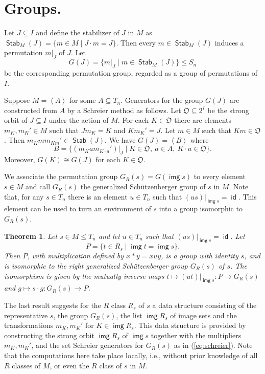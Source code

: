 \documentclass[12pt]{amsart}
\newtheorem{Thm}{Theorem}
\newcommand{\id}{\mathop{\mathsf{id}}\nolimits}
\newcommand{\img}{\mathop{\mathsf{img}}}
\newcommand{\Stab}{\mathop{\mathsf{Stab}}\nolimits}
\renewcommand{\O}{\mathfrak{O}}
\newcommand{\rest}{\big|}  %
\begin{document}
\section{Groups.}
Let $J \subseteq I$ and define the stabilizer of $J$ in  $M$ as $\Stab_M(J) =
\{m \in M  \mid J \cdot  m = J\}$.  Then  every $m \in \Stab_M(J)$  induces a
permutation  $m\rest_J$ of $J$.  Let 
\[
  G(J)  = \{m \rest_J \mid m  \in \Stab_M(J) \} \leq S_n
\]
be  the corresponding permutation group,  regarded as a group of permutations
of $I$.

Suppose $M = \left<A\right>$ for some $A  \subseteq T_n$.  Generators for the
group $G(J)$ are constructed from $A$  by a Schreier method  as follows.  Let
$\O \subseteq 2^I$ be the strong orbit of $J \subseteq I$ under the action of
$M$.  For each $K \in \O$ there are elements  $m_K, m_K' \in  M$ such that $J
m_K = K$ and $K m_K' = J$.  Let $m \in M$ such that  $K m \in \O$.  Then $m_K
m m_{Km}' \in \Stab(J)$.  We have $G(J) = \left<B\right>$ where
\begin{equation} \label{eq:schreier}
  B = \{ (m_K a m_{K \cdot a}')\rest_J \mid K \in \O,\ a \in A,\ 
                                            K \cdot a \in \O\}.
\end{equation}
Moreover,  $G(K) \cong G(J)$ for each $K \in \O$.

We associate the permutation  group $G_R(s) = G(\img s)$  to every element $s
\in M$ and call $G_R(s)$  the  generalized Sch\"utzenberger  group of $s$  in
$M$.  Note  that, for any $s \in  T_n$ there is an element   $u \in T_n$ such
that $(us)\rest_{\img s} =  \id$.    This element can   be  used to turn   an
environment of $s$ into a group isomorphic to $G_R(s)$.

\begin{Thm}
  Let $s \in M \leq T_n$ and let $u \in  T_n$ such that $(us)\rest_{\img s} =
  \id$.  Let
  \[
    P = \{t \in R_s \mid \img t = \img s\}.
  \]
  Then $P$, with multiplication defined by $x  * y = x u  y$, is a group with
  identity $s$, and is  isomorphic to the right  generalized Sch\"utzenberger
  group  $G_R(s)$ of $s$.  The  isomorphism is given  by the mutually inverse
  maps $t  \mapsto (u t)\rest_{\img s}\colon P  \to G_R(s)$  and $g \mapsto s
  \cdot g \colon G_R(s) \to P$.
\end{Thm}

The  last result suggests for   the $R$ class $R_s$ of   $s$ a data structure
consisting of the representative $s$, the group $G_R(s)$, the list $\img R_s$
of image sets and the transformations $m_K, m_K'$ for $K \in \img R_s$.  This
data structure is  provided  by constructing the  strong orbit  $\img R_s$ of
$\img s$  together  with the multipliers  $m_K, m_K'$,  and the set  Schreier
generators   for  $G_R(s)$   as  in   (\ref{eq:schreier}).    Note  that  the
computations here take  place locally, i.e.,  without prior knowledge  of all
$R$ classes of $M$, or even the $R$ class of $s$ in $M$.
\end{document}
